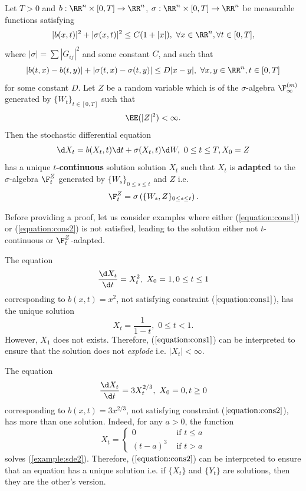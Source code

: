 Let $T>0$ and $b:\RR^n\times[0,T]\to\RR^n$, $\sigma:\RR^n\times[0,T]\to\RR^n$ be measurable functions satisfying
\begin{equation}
  \label{equation:cons1}
  |b(x,t)|^2+|\sigma(x,t)|^2\le C(1+|x|), \,\,\forall x\in\RR^n, \forall t\in[0,T],
\end{equation}
where $|\sigma|=\sum|G_{ij}|^2$ and some constant $C$, and such that
\begin{equation}
  \label{equation:cons2}
  |b(t,x)-b(t,y)|+|\sigma(t,x)-\sigma(t,y)|\le D|x-y|,\,\,\forall x,y\in\RR^n,t\in[0,T]
\end{equation}
for some constant $D$. Let $Z$ be a random variable which is  of the $\sigma$-algebra $\F_\infty^{(m)}$ generated by $\{W_t\}_{t\in[0,T]}$ such that $$\EE(|Z|^2)<\infty.$$
Then the stochastic differential equation
\begin{equation}
  \label{equation:sde:unique}
  \d X_t=b(X_t,t)\d t+\sigma(X_t,t)\d W,\,\, 0\le t\le T, X_0=Z
\end{equation}
has a unique $t$\textbf{-continuous} solution solution $X_t$ such that $X_t$ is \textbf{adapted} to the $\sigma$-algebra $\F_t^Z$ generated by $\{W_s\}_{0\le s\le t}$ and $Z$ i.e.
$$\F_t^Z=\sigma\left(\{W_s,Z\}_{0\le s\le t}\right).$$

Before providing a proof, let us consider examples where either (\ref{equation:cons1}) or (\ref{equation:cons2}) is not satisfied, leading to the solution either not $t$-continuous or $\F_t^Z$-adapted.

\begin{example}
  The equation
  \begin{equation}
    \dfrac{\d X_t}{\d t}=X_t^2,\,\, X_0=1, 0\le t\le 1
  \end{equation}
  corresponding to $b(x,t)=x^2$, not satisfying constraint ($\ref{equation:cons1}$), has the unique solution
  $$X_t=\dfrac{1}{1-t},\,\,0\le t<1.$$
  However, $X_1$ does not exists. Therefore, ($\ref{equation:cons1}$) can be interpreted to ensure that the solution does not \textit{explode} i.e. $|X_t|<\infty$.
\end{example}

\begin{example}
  The equation
  \begin{equation}
    \label{example:sde2}
    \dfrac{\d X_t}{\d t}=3X_t^{2/3},\,\, X_0=0, t\ge0
  \end{equation}
  corresponding to $b(x,t)=3x^{2/3}$, not satisfying constraint ($\ref{equation:cons2}$), has more than one solution. Indeed, for any $a>0$, the function
  $$X_t=\begin{cases}
      0       & \text{ if } t\le a \\
      (t-a)^3 & \text{ if } t>a
    \end{cases}$$
  solves (\ref{example:sde2}). Therefore, ($\ref{equation:cons2}$) can be interpreted to ensure that an equation has a unique solution i.e. if $\{X_t\}$ and $\{Y_t\}$ are solutions, then they are the other's version.
\end{example}

